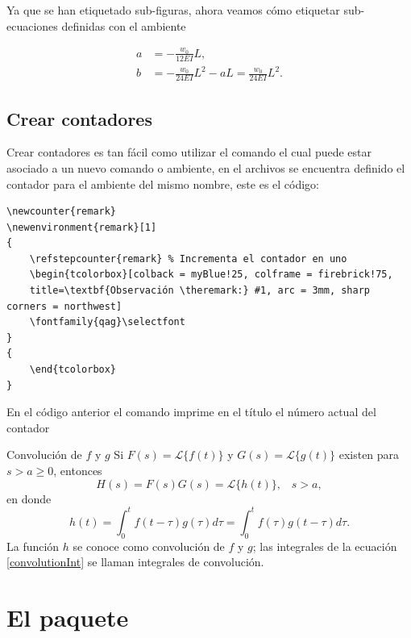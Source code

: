\documentclass{article}
\begin{document}
Ya que se han etiquetado sub-figuras, ahora veamos cómo etiquetar sub-ecuaciones definidas con el ambiente 

\begin{align}
	a &= -\frac{w_0}{12EI}L, \label{a} \\
	b &= -\frac{w_0}{24EI}L^2 - aL = \frac{w_0}{24EI}L^2. \label{b}
\end{align}

\subsection{Crear contadores}

Crear contadores es tan fácil como utilizar el comando  el cual puede estar asociado a un nuevo comando o ambiente, en el archivos  se encuentra definido el contador  para el ambiente del mismo nombre, este es el código:
\begin{verbatim}
\newcounter{remark}
\newenvironment{remark}[1]
{
    \refstepcounter{remark} % Incrementa el contador en uno
    \begin{tcolorbox}[colback = myBlue!25, colframe = firebrick!75, 
    title=\textbf{Observación \theremark:} #1, arc = 3mm, sharp corners = northwest]
    \fontfamily{qag}\selectfont
}
{
    \end{tcolorbox}
}
\end{verbatim}
En el código anterior el comando  imprime en el título el número actual del contador 

\begin{remark}{Convolución de $f$ y $g$}\label{convolution}
Si $F(s) = \mathscr{L}\{f(t)\}$ y $G(s) = \mathscr{L}\{g(t)\}$ existen para $s>a\geq 0$, entonces
\begin{equation}
	H(s) = F(s)G(s) = \mathscr{L}\{h(t)\},\;\;\;  s > a,
\end{equation}
en donde
\begin{equation}
	h(t) = \int_0^tf(t - \tau)g(\tau)d\tau = \int_0^tf(\tau)g(t - \tau)d\tau. \label{convolutionInt}
\end{equation}
La función $h$ se conoce como convolución de $f$ y $g$; las integrales de la ecuación \eqref{convolutionInt} se llaman integrales de convolución.
\end{remark}

\section{El paquete }
\end{document}
